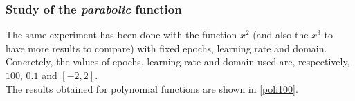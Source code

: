 \documentclass[a4paper, 11pt]{article}
\begin{document}
\subsubsection{Study of the \textit{parabolic} function}
The same experiment has been done with the function $x^2$ (and also the $x^3$ to have more results to compare) with fixed epochs, learning rate and domain.\\
Concretely, the values of epochs, learning rate and domain used are, respectively, $100$, $0.1$ and $[-2,2]$.\\
The results obtained for polynomial functions are shown in \ref{poli100}.
\begin{figure}[h!]
    \centering
     \hspace{0.5em}
     \hspace{0.5em}

\end{figure}
\end{document}

